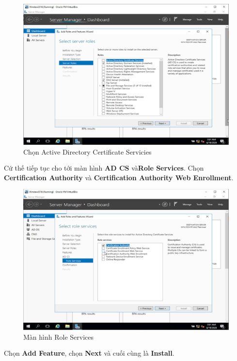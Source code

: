 \begin{figure}[!htb]
    \centering
    \includegraphics[width=0.9\linewidth]{figure//chapter4//lab4_1/add_active_domain_certificate_services.png}
    \caption{Chọn Active Directory Certificate Servicies}
    \label{fig:enter-label}
\end{figure}

 Cứ thế tiếp tục cho tới màn hình \textbf{AD CS} và\textbf{Role Services}. Chọn \textbf{Certification Authority} và \textbf{Certification Authority Web Enrollment}.

\begin{figure}[!htb]
    \centering
    \includegraphics[width=0.9\linewidth]{figure//chapter4//lab4_1/role_service.png}
    \caption{Màn hình Role Services}
    \label{fig:enter-label}
\end{figure}

\noindent Chọn \textbf{Add Feature}, chọn \textbf{Next} và cuối cùng là \textbf{Install}.

